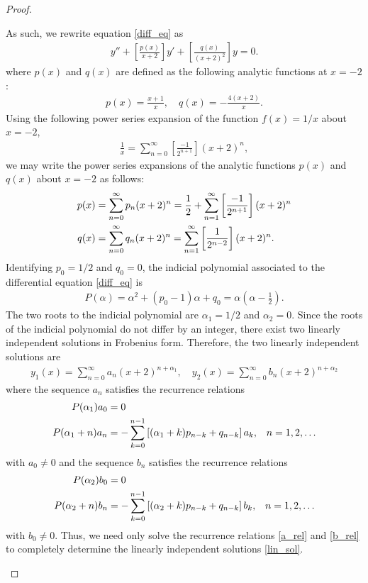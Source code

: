 \documentclass[12pt]{article}
\theoremstyle{definition}
\begin{document}
\begin{proof}
\begin{enumerate}
      As such, we rewrite equation \eqref{diff_eq} as
      \begin{align*}
        y'' + \left[\frac{p(x)}{x+2}\right] y' + \left[\frac{q(x)}{(x+2)^2}\right]y = 0.
      \end{align*}
      where $p(x)$ and $q(x)$ are defined as the following analytic functions at $x=-2$:
      \begin{align*}
        p(x) = \frac{x+1}{x}, \quad q(x) = -\frac{4(x+2)}{x}.
      \end{align*}
      Using the following power series expansion of the function $f(x) = 1/x$ about $x=-2$,
      \begin{align*}
        \frac{1}{x} = \sum_{n=0}^{\infty}\left[\frac{-1}{2^{n+1}}\right](x+2)^n,
      \end{align*}
      we may write the power series expansions of the analytic functions $p(x)$ and $q(x)$ about $x=-2$ as follows:
      \begin{align}\label{power}
        p(x) &= \sum_{n=0}^{\infty} p_n (x+2)^n = \frac{1}{2} + \sum_{n=1}^{\infty} \left[\frac{-1}{2^{n+1}}\right] (x+2)^n \notag \\
        q(x) &= \sum_{n=0}^{\infty} q_n (x+2)^n = \sum_{n=1}^{\infty} \left[\frac{1}{2^{n-2}}\right] (x+2)^n.
      \end{align}
      Identifying $p_0 = 1/2$ and $q_0 = 0$, the indicial polynomial associated to the differential equation \eqref{diff_eq} is
      \begin{align*}
        P(\alpha) = \alpha^2 + (p_0 - 1)\alpha + q_0 = \alpha\left(\alpha - \frac{1}{2}\right).
      \end{align*}
      The two roots to the indicial polynomial are $\alpha_1 = 1/2$ and $\alpha_2 = 0$. Since the roots of the indicial polynomial
      do not differ by an integer, there exist two linearly independent solutions in Frobenius form.
      Therefore, the two linearly independent solutions are
      \begin{align}\label{lin_sol}
        y_1(x) = \sum_{n=0}^\infty a_n (x+2)^{n + \alpha_1}, \quad y_2(x) = \sum_{n=0}^\infty b_n (x+2)^{n + \alpha_2}
      \end{align}
      where the sequence $a_n$ satisfies the recurrence relations
      \begin{align}\label{a_rel}
        P(\alpha_1)a_0 &= 0 & & \notag \\
        P(\alpha_1 + n) a_n &= -\sum_{k=0}^{n-1}\left[(\alpha_1 + k)p_{n-k} + q_{n-k}\right]a_k, &n&=1,2,\dots
      \end{align}
      with $a_0 \neq 0$ and the sequence $b_n$ satisfies the recurrence relations
      \begin{align}\label{b_rel}
        P(\alpha_2)b_0 &= 0 & & \notag \\
        P(\alpha_2 + n) b_n &= -\sum_{k=0}^{n-1}\left[(\alpha_2 + k)p_{n-k} + q_{n-k}\right]b_k, &n&=1,2,\dots
      \end{align}
      with $b_0 \neq 0$.
      Thus, we need only solve the recurrence relations \eqref{a_rel} and \eqref{b_rel} to completely determine the
      linearly independent solutions \eqref{lin_sol}.


\end{enumerate}
\end{proof}
\end{document}
